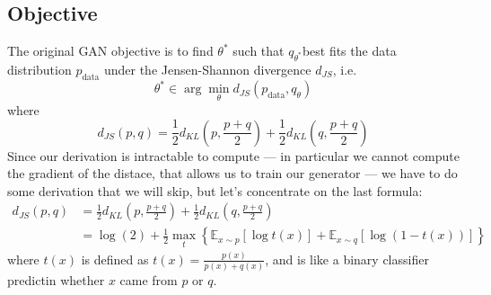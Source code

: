 \subsection{Objective}
The original GAN objective is to find \(\theta^*\) such that \(q_{\theta^*}\)best fits the data distribution \(p_\text{data}\) under the Jensen-Shannon divergence \(d_{JS}\), i.e.
\begin{equation}
    \theta^* \in \arg \min_\theta d_{JS} (p_\text{data}, q_\theta)
\end{equation}
where
\begin{equation}
    d_{JS} (p,q) = \frac 1 2 d_{KL} \left(
        p, \frac {p + q} 2
    \right) + \frac 1 2 d_{KL} \left(
        q, \frac {p + q} 2
    \right)
\end{equation}
Since our derivation is intractable to compute --- in particular we cannot compute the gradient of the distace, that allows us to train our generator --- we have to do some derivation that we will skip, but let's concentrate on the last formula:
\begin{align}
    d_{JS} (p,q) &= \frac 1 2 d_{KL} \left(
        p, \frac {p + q} 2
    \right) + \frac 1 2 d_{KL} \left(
        q, \frac {p + q} 2
    \right)\\
    &= \log (2) + \frac 1 2 \max_t \left\{
        \mathbb{E}_{x \sim p} \left[ \log t(x) \right] + \mathbb{E}_{x \sim q} \left[ \log (1 - t(x)) \right]
    \right\}
\end{align}
where \(t(x)\) is defined as \(t(x) = \frac {p(x)} {p(x) + q(x)}\), and is like a binary classifier predictin whether \(x\) came from \(p\) or \(q\). 

